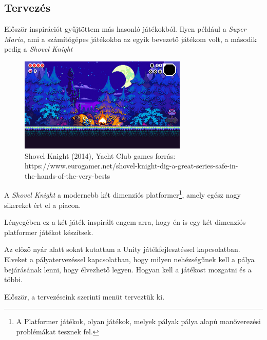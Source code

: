 \documentclass[]{thesis-ekf}
\theoremstyle{definition}
\begin{document}
	\subsection{Tervezés}
	Először inspirációt gyűjtöttem más hasonló játékokból. Ilyen például a \emph{Super Mario}, ami a számítógépes játékokba az egyik bevezető játékom volt, a második pedig a \emph{Shovel Knight} 
	
	\begin{figure}[!ht]
		\label{kep:shovelknight}
		\centering
		\includegraphics[width=8cm]{shovelknight}
		\caption{Shovel Knight (2014), Yacht Club games forrás: https://www.eurogamer.net/shovel-knight-dig-a-great-series-safe-in-the-hands-of-the-very-bests}
	\end{figure}

	A \emph{Shovel Knight} a modernebb két dimenziós platformer\footnote{A Platformer játékok, olyan játékok, melyek pályak pálya alapú manőverezési problémákat tesznek fel.}, amely egész nagy sikereket ért el a piacon.
	
	Lényegében ez a két játék inspirált engem arra, hogy én is egy két dimenziós platformer játékot készítsek.
	
	Az előző nyár alatt sokat kutattam a Unity játékfejlesztéssel kapcsolatban. Elveket a pályatervezéssel kapcsolatban, hogy milyen nehézségűnek kell a pálya bejárásának lenni, hogy élvezhető legyen.
	Hogyan kell a játékost mozgatni és a többi.
	
	
	Először, a tervezéseink szerinti menüt terveztük ki.
	
\end{document}
